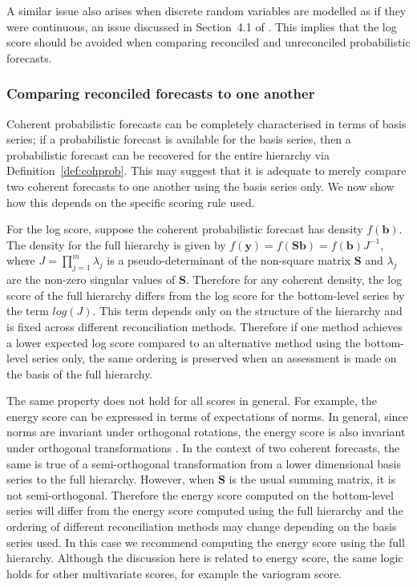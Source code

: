 \documentclass[12pt]{article}
\theoremstyle{definition}
\begin{document}
A similar issue also arises when discrete random variables are modelled as if they were continuous, an issue discussed in Section~4.1 of \citet{Gneiting2007}. This implies that the log score should be avoided when comparing reconciled and unreconciled probabilistic forecasts.

\subsubsection{Comparing reconciled forecasts to one another}

Coherent probabilistic forecasts can be completely characterised in terms of basis series; if a probabilistic forecast is available for the basis series, then a probabilistic forecast can be recovered for the entire hierarchy via Definition~\ref{def:cohprob}. This may suggest that it is adequate to merely compare two coherent forecasts to one another using the basis series only. We now show how this depends on the specific scoring rule used.

For the log score, suppose the coherent probabilistic forecast has density $f(\bm{b})$. The density for the full hierarchy is given by $f(\bm{y})=f(\bm{Sb})=f(\bm{b})J^{-1}$, where $J=\prod_{j=1}^{m}\lambda_j$ is a pseudo-determinant of the non-square matrix $\bm{S}$ and $\lambda_j$ are the non-zero singular values of $\bm{S}$. Therefore for any coherent density, the log score of the full hierarchy differs from the log score for the bottom-level series by the term $log(J)$. This term depends only on the structure of the hierarchy and is fixed across different reconciliation methods. Therefore if one method achieves a lower expected log score compared to an alternative method using the bottom-level series only, the same ordering is preserved when an assessment is made on the basis of the full hierarchy.

The same property does not hold for all scores in general. For example, the energy score can be expressed in terms of expectations of norms. In general, since norms are invariant under orthogonal rotations, the energy score is also invariant under orthogonal transformations \citep{Szekely2013,Gneiting2007}. In the context of two coherent forecasts, the same is true of a semi-orthogonal transformation from a lower dimensional basis series to the full hierarchy. However, when $\bm{S}$ is the usual summing matrix, it is not semi-orthogonal. Therefore the energy score computed on the bottom-level series will differ from the energy score computed using the full hierarchy and the ordering of different reconciliation methods may change depending on the basis series used. In this case we recommend computing the energy score using the full hierarchy. Although the discussion here is related to energy score, the same logic holds for other multivariate scores, for example the variogram score.
\end{document}
